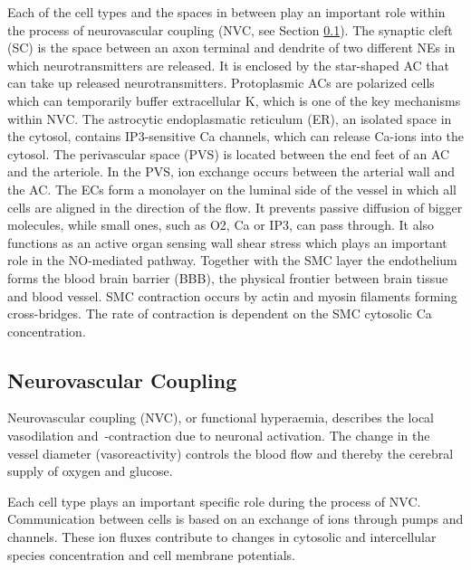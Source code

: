 Each of the cell types and the spaces in between play an important role within the process of neurovascular coupling (\gls{NVC}, see Section \ref{section:NVC}). The synaptic cleft (\gls{SC}) is the space between an axon terminal and dendrite of two different \gls{NE}s in which neurotransmitters are released. It is enclosed by the star-shaped \gls{AC} that can take up released neurotransmitters. Protoplasmic \gls{AC}s are  polarized cells which can temporarily buffer extracellular \gls{K}, which is one of the key mechanisms within \gls{NVC}.  The astrocytic endoplasmatic reticulum (\gls{ER}), an isolated space in the cytosol, contains \gls{IP3}-sensitive \gls{Ca} channels, which can release \gls{Ca}-ions into the cytosol. The perivascular space (\gls{PVS}) is located between the end feet of an \gls{AC} and the arteriole. In the \gls{PVS}, ion exchange occurs between the arterial wall and the \gls{AC}.  The \gls{EC}s form a monolayer on the luminal side of the vessel in which all cells are aligned in the direction of the flow. It prevents passive diffusion of bigger molecules, while small ones, such as \gls{O2}, \gls{Ca} or \gls{IP3}, can pass through.  It also functions as an active organ sensing wall shear stress which plays an important role in the \gls{NO}-mediated pathway. Together with the SMC layer the endothelium forms the blood brain barrier (BBB), the physical frontier between brain tissue and blood vessel.
\gls{SMC} contraction occurs by actin and myosin filaments forming cross-bridges. The rate of contraction is dependent on the \gls{SMC} cytosolic \gls{Ca} concentration.
 






\subsection{Neurovascular Coupling} \label{section:NVC}
Neurovascular coupling (\gls{NVC}), or functional hyperaemia, describes the local vasodilation and~-contraction due to neuronal activation. The change in the vessel diameter (vasoreactivity) controls the blood flow and thereby the cerebral supply of oxygen and glucose.

Each cell type plays an important specific role during the process of NVC. Communication between cells is based on an exchange of ions through pumps and channels. These ion fluxes contribute to changes in cytosolic and intercellular species concentration and cell membrane potentials.

